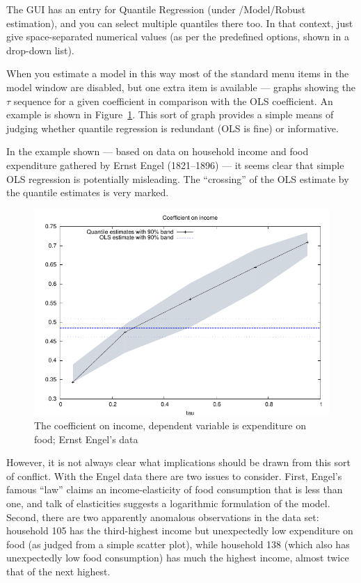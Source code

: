 The  GUI has an entry for Quantile Regression (under
\textsf{/Model/Robust estimation}), and you can select multiple
quantiles there too.  In that context, just give space-separated
numerical values (as per the predefined options, shown in a drop-down
list).  

When you estimate a model in this way most of the standard menu items
in the model window are disabled, but one extra item is available ---
graphs showing the $\tau$ sequence for a given coefficient in
comparison with the OLS coefficient.  An example is shown in
Figure~\ref{fig:tau}.  This sort of graph provides a simple means of
judging whether quantile regression is redundant (OLS is fine) or
informative.  

In the example shown --- based on data on household income and food
expenditure gathered by Ernst Engel (1821--1896) --- it seems clear
that simple OLS regression is potentially misleading.  The
``crossing'' of the OLS estimate by the quantile estimates is very
marked.  

\begin{figure}
  \centering
  \includegraphics{figures/tau-sequence}
  \caption{The coefficient on income, dependent variable is
    expenditure on food; Ernst Engel's data}
  \label{fig:tau}
\end{figure}

However, it is not always clear what implications should be drawn from
this sort of conflict.  With the Engel data there are two issues to
consider.  First, Engel's famous ``law'' claims an income-elasticity
of food consumption that is less than one, and talk of elasticities
suggests a logarithmic formulation of the model.  Second, there are
two apparently anomalous observations in the data set: household 105
has the third-highest income but unexpectedly low expenditure on food
(as judged from a simple scatter plot), while household 138 (which
also has unexpectedly low food consumption) has much the highest
income, almost twice that of the next highest.

